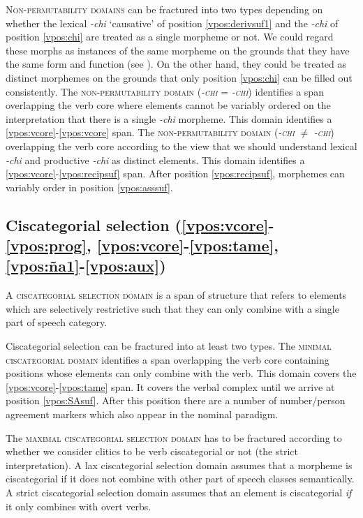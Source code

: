 \documentclass[output=paper]{langscibook}
\begin{document}
\textsc{Non-permutability domains} can be fractured into two types depending on whether the lexical \textit{-chi} `causative' of position \ref{vpos:derivsuf1} and the \textit{-chi} of position \ref{vpos:chi} are treated as a single morpheme or not. We could regard these morphs as instances of the same morpheme on the grounds that they have the same form and function (see ). On the other hand, they could be treated as distinct morphemes on the grounds that only position \ref{vpos:chi} can be filled out consistently. The \textsc{non-permu\-ta\-bil\-i\-ty domain (\textit{-chi} = \textit{-chi})} identifies a span overlapping the verb core where elements cannot be variably ordered on the interpretation that there is a single \textit{-chi} morpheme. This domain identifies a \ref{vpos:vcore}-\ref{vpos:vcore} span. The \textsc{non-permutability domain (\textit{-chi} $\neq$ \textit{-chi})} overlapping the verb core according to the view that we should understand lexical \textit{-chi} and productive \textit{-chi} as distinct elements. This domain identifies a \ref{vpos:vcore}-\ref{vpos:recipsuf} span. After position \ref{vpos:recipsuf}, morphemes can variably order in position \ref{vpos:asssuf}.

\subsection{Ciscategorial selection (\ref{vpos:vcore}-\ref{vpos:prog}, \ref{vpos:vcore}-\ref{vpos:tame}, \ref{vpos:ña1}-\ref{vpos:aux})}
\largerpage

A \textsc{ciscategorial selection domain} is a span of structure that refers to elements which are selectively restrictive such that they can only combine with a single part of speech category. 

Ciscategorial selection can be fractured into at least two types. The \textsc{minimal ciscategorial domain} identifies a span overlapping the verb core containing positions whose elements can only combine with the verb. This domain covers the \ref{vpos:vcore}-\ref{vpos:tame} span. It covers the verbal complex until we arrive at position \ref{vpos:SAsuf}. After this position there are a number of number/person agreement markers which also appear in the nominal paradigm.

The \textsc{maximal ciscategorial selection domain} has to be fractured according to whether we consider clitics to be verb ciscategorial or not (the strict interpretation). A lax ciscategorial selection domain assumes that a morpheme is ciscategorial if it does not combine with other part of speech classes semantically. A strict ciscategorial selection domain assumes that an element is ciscategorial \textit{if} it only combines with overt verbs.
\end{document}
